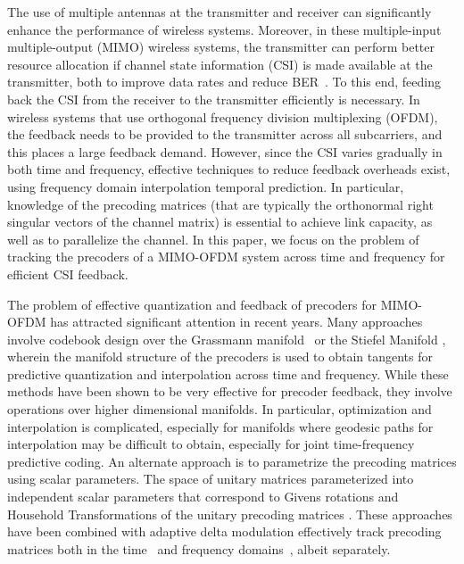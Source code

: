 \documentclass[conference]{IEEEtran}
\begin{document}
The use of multiple antennas at the transmitter and receiver can significantly enhance the performance of wireless systems. Moreover, in these multiple-input multiple-output (MIMO) wireless systems, the transmitter can perform better resource allocation if channel state information (CSI) is made available at the transmitter, both to improve data rates and reduce BER~\cite{love2008overview}. To this end, feeding back the CSI from the receiver to the transmitter efficiently is necessary. In wireless systems that use orthogonal frequency division multiplexing (OFDM), the feedback needs to be provided to the transmitter across all subcarriers, and this places a large feedback demand. However, since the CSI varies gradually in both time and frequency, effective techniques to reduce feedback overheads exist, using frequency domain interpolation temporal prediction. In particular, knowledge of the precoding matrices (that are typically the orthonormal right singular vectors of the channel matrix) is essential to achieve link capacity, as well as to parallelize the channel. In this paper, we focus on the problem of tracking the precoders of a MIMO-OFDM system across time and frequency for efficient CSI feedback.

The problem of effective quantization and feedback of precoders for MIMO-OFDM has attracted significant attention in recent years. Many approaches involve codebook design over the Grassmann manifold~\cite{mondal2007quantization,schwarz2013adaptive,5946308} or the Stiefel Manifold \cite{6891198,Gupt1905:Predictive}, wherein the manifold structure of the precoders is used to obtain tangents for predictive quantization and interpolation across time and frequency. While these methods have been shown to be very effective for precoder feedback,  they involve operations over higher dimensional manifolds. In particular, optimization and interpolation is complicated, especially for manifolds where geodesic paths for interpolation may be difficult to obtain, especially for joint time-frequency predictive coding. An alternate approach is to parametrize the precoding matrices using scalar parameters. The space of unitary matrices parameterized into independent scalar parameters that correspond to Givens rotations and Household Transformations of the unitary precoding matrices \cite{4114278,4556174}. These approaches have been combined with adaptive delta modulation effectively track precoding matrices both in the time~\cite{4114278} and frequency domains~\cite{4556174}, albeit separately.
\end{document}
